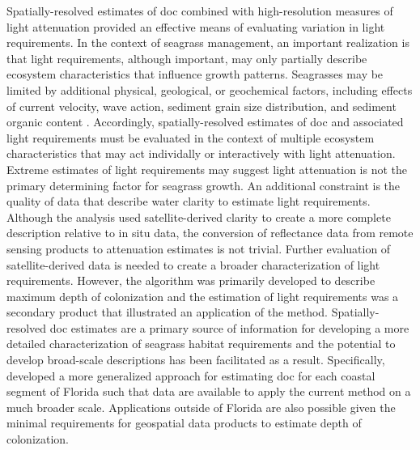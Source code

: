 \documentclass[letterpaper,12pt,oneside]{article}\usepackage[]{graphicx}\usepackage[]{color}
\begin{document}
Spatially-resolved estimates of \ac{doc} combined with high-resolution measures of light attenuation provided an effective means of evaluating variation in light requirements.  In the context of seagrass management, an important realization is that light requirements, although important, may only partially describe ecosystem characteristics that influence growth patterns.  Seagrasses may be limited by additional physical, geological, or geochemical factors, including effects of current velocity, wave action, sediment grain size distribution, and sediment organic content \citep{Koch01}.  Accordingly, spatially-resolved estimates of \ac{doc} and associated light requirements must be evaluated in the context of multiple ecosystem characteristics that may act individally or interactively with light attenuation.  Extreme estimates of light requirements may suggest light attenuation is not the primary determining factor for seagrass growth.  An additional constraint is the quality of data that describe water clarity to estimate light requirements.  Although the analysis used satellite-derived clarity to create a more complete description relative to in situ data, the conversion of reflectance data from remote sensing products to attenuation estimates is not trivial.  Further evaluation of satellite-derived data is needed to create a broader characterization of light requirements.  However, the algorithm was primarily developed to describe maximum depth of colonization and the estimation of light requirements was a secondary product that illustrated an application of the method.  Spatially-resolved \ac{doc} estimates are a primary source of information for developing a more detailed characterization of seagrass habitat requirements and the potential to develop broad-scale descriptions has been facilitated as a result.  Specifically,  developed a more generalized approach for estimating \ac{doc} for each coastal segment of Florida such that data are available to apply the current method on a much broader scale.  Applications outside of Florida are also possible given the minimal requirements for geospatial data products to estimate depth of colonization.  

\clearpage
\begin{singlespace}


\end{singlespace}
\clearpage

\end{document}
